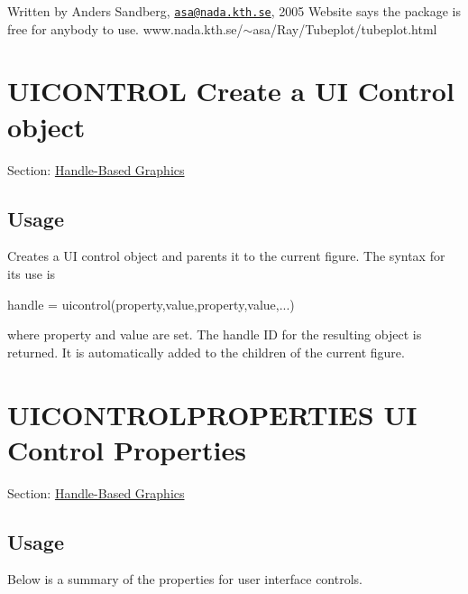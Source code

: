 Written by Anders Sandberg, \href{mailto:asa@nada.kth.se}{\tt asa@nada.\-kth.\-se}, 2005 Website says the package is free for anybody to use. www.\-nada.\-kth.\-se/$\sim$asa/\-Ray/\-Tubeplot/tubeplot.html \hypertarget{handle_uicontrol}{}\section{U\-I\-C\-O\-N\-T\-R\-O\-L Create a U\-I Control object}\label{handle_uicontrol}
Section\-: \hyperlink{sec_handle}{Handle-\/\-Based Graphics} \hypertarget{vtkwidgets_vtkxyplotwidget_Usage}{}\subsection{Usage}\label{vtkwidgets_vtkxyplotwidget_Usage}
Creates a U\-I control object and parents it to the current figure. The syntax for its use is \begin{DoxyVerb}  handle = uicontrol(property,value,property,value,...)
\end{DoxyVerb}
 where {\ttfamily property} and {\ttfamily value} are set. The handle I\-D for the resulting object is returned. It is automatically added to the children of the current figure. \hypertarget{handle_uicontrolproperties}{}\section{U\-I\-C\-O\-N\-T\-R\-O\-L\-P\-R\-O\-P\-E\-R\-T\-I\-E\-S U\-I Control Properties}\label{handle_uicontrolproperties}
Section\-: \hyperlink{sec_handle}{Handle-\/\-Based Graphics} \hypertarget{vtkwidgets_vtkxyplotwidget_Usage}{}\subsection{Usage}\label{vtkwidgets_vtkxyplotwidget_Usage}
Below is a summary of the properties for user interface controls. 
